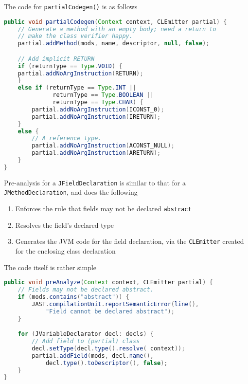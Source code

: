 \documentclass[8pt,a4paper,compress]{beamer}
\begin{document}
\begin{frame}[fragile]
\pause

The code for \lstinline{partialCodegen()} is as follows
\begin{lstlisting}[language=Java]
public void partialCodegen(Context context, CLEmitter partial) {
    // Generate a method with an empty body; need a return to
    // make the class verifier happy.
    partial.addMethod(mods, name, descriptor, null, false);

    // Add implicit RETURN
    if (returnType == Type.VOID) {
	partial.addNoArgInstruction(RETURN);
    }
    else if (returnType == Type.INT ||
              returnType == Type.BOOLEAN ||
              returnType == Type.CHAR) {
        partial.addNoArgInstruction(ICONST_0);
        partial.addNoArgInstruction(IRETURN);
    }
    else {
        // A reference type.
        partial.addNoArgInstruction(ACONST_NULL);
        partial.addNoArgInstruction(ARETURN);
    }
}
\end{lstlisting}
\end{frame}

\begin{frame}[fragile]
\pause

Pre-analysis for a \lstinline{JFieldDeclaration} is similar to that for a \lstinline{JMethodDeclaration}, and does the following
\begin{enumerate}
\item Enforces the rule that fields may not be declared \lstinline{abstract}
\item Resolves the field's declared type
\item Generates the JVM code for the field declaration, via the \lstinline{CLEmitter} created for the enclosing class declaration
\end{enumerate}

\pause
\bigskip

The code itself is rather simple
\begin{lstlisting}[language=Java]
public void preAnalyze(Context context, CLEmitter partial) {
    // Fields may not be declared abstract.
    if (mods.contains("abstract")) {
        JAST.compilationUnit.reportSemanticError(line(),
            "Field cannot be declared abstract");
    }

    for (JVariableDeclarator decl: decls) {
        // Add field to (partial) class
        decl.setType(decl.type().resolve( context));
        partial.addField(mods, decl.name(),
            decl.type().toDescriptor(), false);
    }
}
\end{lstlisting}
\end{frame}
\end{document}
